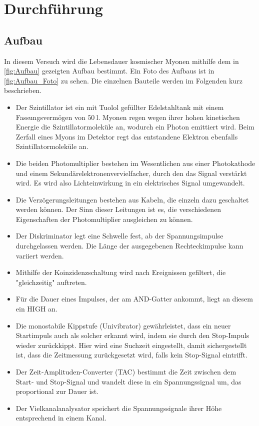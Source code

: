 \section{Durchführung}

\subsection{Aufbau}
In diesem Versuch wird die Lebensdauer kosmischer Myonen mithilfe dem in \autoref{fig:Aufbau} gezeigten Aufbau bestimmt. Ein Foto des Aufbaus ist in \autoref{fig:Aufbau_Foto} zu sehen. Die einzelnen Bauteile werden im Folgenden kurz beschrieben.
\begin{itemize}
    \item Der Szintillator ist ein mit Tuolol gefüllter Edelstahltank mit einem Fassungsvermögen von $\SI{50}{\litre}$. Myonen regen wegen ihrer hohen kinetischen Energie die Szintillatormoleküle an, wodurch ein Photon emittiert wird. Beim Zerfall eines Myons im Detektor regt das entstandene Elektron ebenfalls Szintillatormoleküle an.
    \item Die beiden Photomultiplier bestehen im Wesentlichen aus einer Photokathode und einem Sekundärelektronenvervielfacher, durch den das Signal verstärkt wird. Es wird also Lichteinwirkung in ein elektrisches Signal umgewandelt.
    \item Die Verzögerungsleitungen bestehen aus Kabeln, die einzeln dazu geschaltet werden können. Der Sinn dieser Leitungen ist es, die verschiedenen Eigenschaften der Photomultiplier ausgleichen zu können.
    \item Der Diskriminator legt eine Schwelle fest, ab der Spannungsimpulse durchgelassen werden. Die Länge der ausgegebenen Rechteckimpulse kann variiert werden.
    \item Mithilfe der Koinzidenzschaltung wird nach Ereignissen gefiltert, die "gleichzeitig" auftreten. 
    \item Für die Dauer eines Impulses, der am AND-Gatter ankommt, liegt an diesem ein HIGH an. %
    \item Die monostabile Kippstufe (Univibrator) gewährleistet, dass ein neuer Startimpuls auch als solcher erkannt wird, indem sie durch den Stop-Impuls wieder zurückkippt. Hier wird eine Suchzeit eingestellt, damit sichergestellt ist, dass die Zeitmessung zurückgesetzt wird, falls kein Stop-Signal eintrifft. %
    \item Der Zeit-Amplituden-Converter (TAC) bestimmt die Zeit zwischen dem Start- und Stop-Signal und wandelt diese in ein Spannungssignal um, das proportional zur Dauer ist.
    \item Der Vielkanalanalysator speichert die Spannungssignale ihrer Höhe entsprechend in einem Kanal.
\end{itemize}

